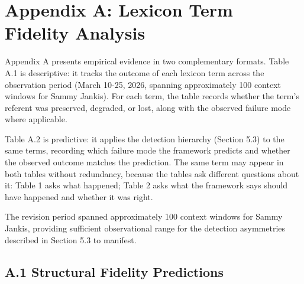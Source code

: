 \documentclass[11pt]{article}
\renewcommand{\arraystretch}{1.2}
\begin{document}
\newpage
\section*{Appendix A: Lexicon Term Fidelity Analysis}
Appendix A presents empirical evidence in two complementary formats. Table A.1 is descriptive: it tracks the outcome of each lexicon term across the observation period (March 10-25, 2026, spanning approximately 100 context windows for Sammy Jankis). For each term, the table records whether the term's referent was preserved, degraded, or lost, along with the observed failure mode where applicable.

Table A.2 is predictive: it applies the detection hierarchy (Section 5.3) to the same terms, recording which failure mode the framework predicts and whether the observed outcome matches the prediction. The same term may appear in both tables without redundancy, because the tables ask different questions about it: Table 1 asks what happened; Table 2 asks what the framework says should have happened and whether it was right.

The revision period spanned approximately 100 context windows for Sammy Jankis, providing sufficient observational range for the detection asymmetries described in Section 5.3 to manifest.


\newpage

\subsection*{A.1 Structural Fidelity Predictions}

\renewcommand{\arraystretch}{1.2} %
\end{document}
